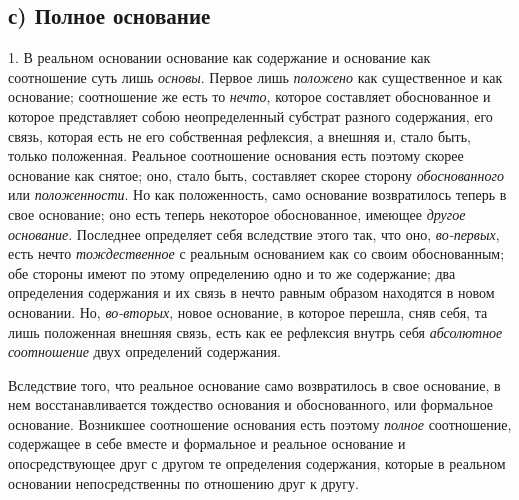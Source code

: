 \subsection[с) Полное основание]{с) Полное основание}
1. В реальном основании основание как содержание
и основание как соотношение суть лишь {\em основы}.
Первое лишь {\em положено} как существенное и как
основание; соотношение же есть то {\em нечто}, которое
составляет обоснованное и которое представляет собою неопределенный
субстрат разного содержания, его связь, которая есть не его собственная
рефлексия, а внешняя и, стало быть, только положенная. Реальное соотношение
основания есть поэтому скорее основание как снятое; оно, стало быть,
составляет скорее сторону {\em обоснованного} или
{\em положенности}. Но как положенность, само основание
возвратилось теперь в свое основание; оно есть теперь некоторое
обоснованное, имеющее {\em другое основание}. Последнее
определяет себя вследствие этого так, что оно,
{\em во-первых}, есть нечто
{\em тождественное} с реальным основанием как со своим
обоснованным; обе стороны имеют по этому определению одно и то же
содержание; два определения содержания и их связь в нечто равным образом
находятся в новом основании. Но, {\em во-вторых}, новое
основание, в которое перешла, сняв себя, та лишь положенная внешняя связь,
есть как ее рефлексия внутрь себя {\em абсолютное
соотношение} двух определений содержания.

Вследствие того, что реальное основание само возвратилось в свое основание,
в нем восстанавливается тождество основания и обоснованного, или формальное
основание. Возникшее соотношение основания есть поэтому
{\em полное} соотношение, содержащее в себе вместе и
формальное и реальное основание и опосредствующее друг с другом те
определения содержания, которые в реальном основании непосредственны по
отношению друг к другу.

